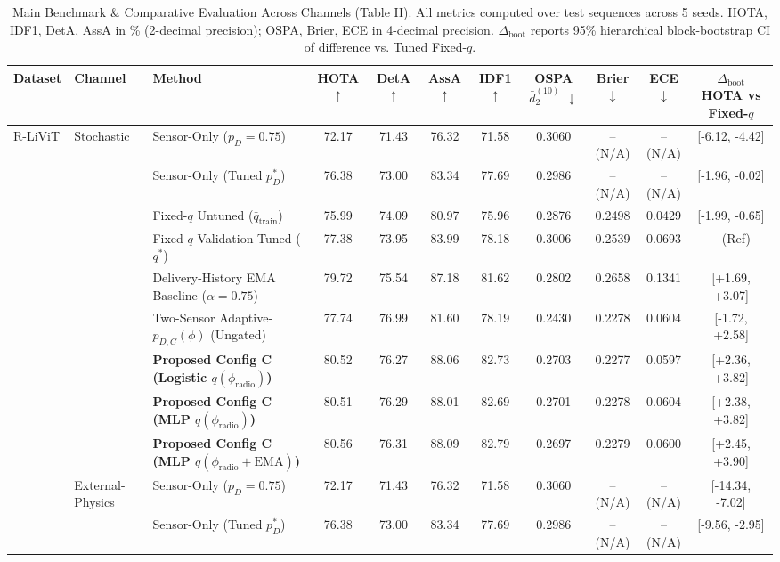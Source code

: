 \begin{table}[!t]
\caption{Main Benchmark & Comparative Evaluation Across Channels (Table II). All metrics computed over test sequences across 5 seeds. HOTA, IDF1, DetA, AssA in \% (2-decimal precision); OSPA, Brier, ECE in 4-decimal precision. $\Delta_{\text{boot}}$ reports 95\% hierarchical block-bootstrap CI of difference vs. Tuned Fixed-$q$.}
\label{tab:main_benchmark}
\centering
\scriptsize
\setlength{\tabcolsep}{3.5pt}
\begin{tabular}{lllcccccccc}
\toprule
Dataset & Channel & Method & HOTA $\uparrow$ & DetA $\uparrow$ & AssA $\uparrow$ & IDF1 $\uparrow$ & OSPA $\bar{d}_2^{(10)}$ $\downarrow$ & Brier $\downarrow$ & ECE $\downarrow$ & $\Delta_{\text{boot}}$ HOTA vs Fixed-$q$ \\
\midrule
R-LiViT & Stochastic & Sensor-Only ($p_D=0.75$) & 72.17 & 71.43 & 76.32 & 71.58 & 0.3060 & -- (N/A) & -- (N/A) & [-6.12, -4.42] \\
 &  & Sensor-Only (Tuned $p_D^*$) & 76.38 & 73.00 & 83.34 & 77.69 & 0.2986 & -- (N/A) & -- (N/A) & [-1.96, -0.02] \\
 &  & Fixed-$q$ Untuned ($\bar{q}_{\text{train}}$) & 75.99 & 74.09 & 80.97 & 75.96 & 0.2876 & 0.2498 & 0.0429 & [-1.99, -0.65] \\
 &  & Fixed-$q$ Validation-Tuned ($q^*$) & 77.38 & 73.95 & 83.99 & 78.18 & 0.3006 & 0.2539 & 0.0693 & -- (Ref) \\
 &  & Delivery-History EMA Baseline ($\alpha=0.75$) & 79.72 & 75.54 & 87.18 & 81.62 & 0.2802 & 0.2658 & 0.1341 & [+1.69, +3.07] \\
 &  & Two-Sensor Adaptive-$p_{D,C}(\phi)$ (Ungated) & 77.74 & 76.99 & 81.60 & 78.19 & 0.2430 & 0.2278 & 0.0604 & [-1.72, +2.58] \\
 &  & \textbf{Proposed Config C (Logistic $q(\phi_{\text{radio}})$)} & 80.52 & 76.27 & 88.06 & 82.73 & 0.2703 & 0.2277 & 0.0597 & [+2.36, +3.82] \\
 &  & \textbf{Proposed Config C (MLP $q(\phi_{\text{radio}})$)} & 80.51 & 76.29 & 88.01 & 82.69 & 0.2701 & 0.2278 & 0.0604 & [+2.38, +3.82] \\
 &  & \textbf{Proposed Config C (MLP $q(\phi_{\text{radio}}+\text{EMA})$)} & 80.56 & 76.31 & 88.09 & 82.79 & 0.2697 & 0.2279 & 0.0600 & [+2.45, +3.90] \\
\midrule
 & External-Physics & Sensor-Only ($p_D=0.75$) & 72.17 & 71.43 & 76.32 & 71.58 & 0.3060 & -- (N/A) & -- (N/A) & [-14.34, -7.02] \\
 &  & Sensor-Only (Tuned $p_D^*$) & 76.38 & 73.00 & 83.34 & 77.69 & 0.2986 & -- (N/A) & -- (N/A) & [-9.56, -2.95] \\

\end{tabular}
\end{table}
